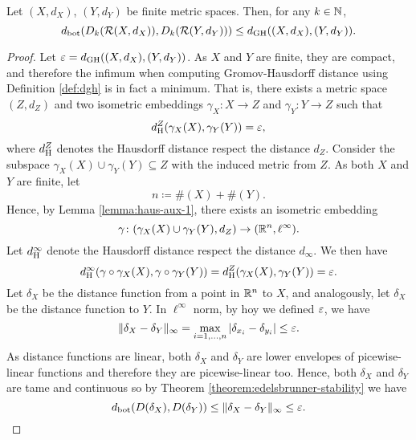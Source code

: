 \begin{theorem} \label{theorem:gh-stability}
    Let $ (X, d_X) $, $ (Y, d_Y) $ be finite metric spaces. Then, for any $ k \in \mathbb N$, 
    \begin{equation}
        d_{\operatorname{bot}}( D_k(\mathcal{R}(X, d_X)), D_k(\mathcal{R}(Y, d_Y))) \leq d_{\operatorname{GH}}((X, d_X), (Y, d_Y)).
    \end{equation}
\end{theorem}
\begin{proof}
    Let $ \varepsilon = d_{\operatorname{GH}}((X, d_X), (Y, d_Y)) $. As $ X $ and $ Y $ are finite, they are compact, and therefore the infimum when computing Gromov-Hausdorff distance using Definition \ref{def:dgh} is in fact a minimum. That is, there exists a metric space $ (Z, d_Z) $ and two isometric embeddings $ \gamma_X \colon X \to Z $ and $ \gamma_Y \colon Y \to Z $ such that
    \begin{equation}
        d_{\operatorname{H}}^Z(\gamma_X(X), \gamma_Y(Y)) = \varepsilon,
    \end{equation}
    where $ d_{\operatorname{H}}^Z $ denotes the Hausdorff distance respect the distance $ d_Z $. Consider the subspace $ \gamma_X(X) \cup \gamma_Y(Y) \subseteq Z $ with the induced metric from $ Z $. As both $ X $ and $ Y $ are finite, let
    \begin{equation}
        n \coloneq \#(X) + \#(Y). 
    \end{equation}
    Hence, by Lemma \ref{lemma:haus-aux-1}, there exists an isometric embedding
    \begin{equation}
        \gamma \colon (\gamma_X(X) \cup \gamma_Y(Y), d_Z) \to (\mathbb R^n, \ell^\infty).
    \end{equation}
    Let $ d_{\operatorname{H}}^\infty $ denote the Hausdorff distance respect the distance $ d_\infty $. We then have
    \begin{equation}
        d_{\operatorname{H}}^\infty(\gamma \circ \gamma_X(X), \gamma \circ \gamma_Y(Y)) = d_{\operatorname{H}}^Z(\gamma_X(X), \gamma_Y(Y)) = \varepsilon.
    \end{equation}
    Let $ \delta_X $ be the distance function from a point in $ \mathbb R^n $ to $ X $, and analogously, let $ \delta_X $ be the distance function to $ Y $. In $ \ell^\infty $ norm, by hoy we defined $\varepsilon$, we have
    \begin{equation}
        \| \delta_X - \delta_Y \|_\infty = \max_{i=1, \dots, n} | \delta_{x_i} - \delta_{y_i} | \leq \varepsilon.
    \end{equation}
    As distance functions are linear, both $ \delta_X $ and $ \delta_Y $ are lower envelopes of picewise-linear functions and therefore they are picewise-linear too. Hence,  both $ \delta_X $ and $ \delta_Y $ are tame and continuous so by Theorem \ref{theorem:edelsbrunner-stability} we have
    \begin{equation}
        d_{\operatorname{bot}}(D(\delta_X), D(\delta_Y)) \leq \| \delta_X - \delta_Y \|_\infty \leq \varepsilon.
    \end{equation}


\end{proof}
